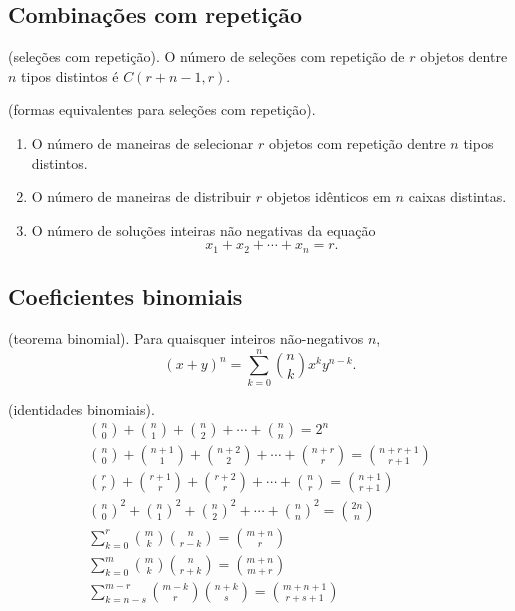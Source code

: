 \documentclass{article}
\begin{document}
\subsection{Combinações com repetição}

\begin{thm} (seleções com repetição).
    O número de seleções com repetição de \(r\) objetos dentre \(n\) tipos distintos é \(C(r+n-1,r)\).
\end{thm}

\begin{prop} (formas equivalentes para seleções com repetição).
    \begin{enumerate}
        \item O número de maneiras de selecionar \(r\) objetos com repetição dentre \(n\) tipos distintos.
        \item O número de maneiras de distribuir \(r\) objetos idênticos em \(n\) caixas distintas.
        \item O número de soluções inteiras não negativas da equação
        \begin{equation}
            x_1 + x_2 + \cdots + x_n = r.
        \end{equation}
    \end{enumerate}
\end{prop}

\subsection{Coeficientes binomiais}

\begin{thm} (teorema binomial).
    Para quaisquer inteiros não-negativos \(n\),
    \begin{equation}
        (x+y)^n = \sum_{k=0}^{n} \binom{n}{k} x^k y^{n-k}.
    \end{equation}
\end{thm}

\begin{prop} (identidades binomiais).
    \begin{gather}
        \binom{n}{0}+\binom{n}{1}+\binom{n}{2}+\cdots+\binom{n}{n} = 2^n \\
        \binom{n}{0}+\binom{n+1}{1}+\binom{n+2}{2}+\cdots+\binom{n+r}{r} = \binom{n+r+1}{r+1} \\
        \binom{r}{r}+\binom{r+1}{r}+\binom{r+2}{r}+\cdots+\binom{n}{r} = \binom{n+1}{r+1} \\
        \binom{n}{0}^2 + \binom{n}{1}^2 + \binom{n}{2}^2 + \cdots + \binom{n}{n}^2 = \binom{2n}{n} \\
        \sum_{k=0}^{r} \binom{m}{k}\binom{n}{r-k} = \binom{m+n}{r} \\
        \sum_{k=0}^{m} \binom{m}{k}\binom{n}{r+k} = \binom{m+n}{m+r} \\
        \sum_{k=n-s}^{m-r} \binom{m-k}{r}\binom{n+k}{s} = \binom{m+n+1}{r+s+1} \\
    \end{gather}
\end{prop}
\end{document}
